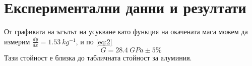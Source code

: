 \documentclass[aps, prb, twocolumn, a4paper, floatfix, reprint]{revtex4-2}
\begin{document}
\section{Експериментални данни и резултати}


От графиката на ъгълът на усукване като функция на окачената маса можем да измерим $\frac{dy}{dx} = 1.53 \ kg^{-1}$, и по \eqref{eq:2} 
\begin{equation}
    G = 28.4 \ GPa \pm 5\%
\end{equation}
Тази стойност е близка до табличната стойност за алуминия. 
\end{document}
